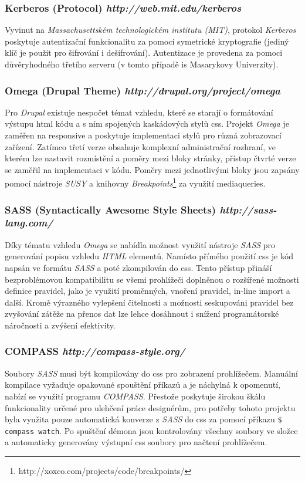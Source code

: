 \subsubsection*{\textbf{Kerberos} (Protocol) \hfill \emph{http://web.mit.edu/kerberos}}
Vyvinut na \emph{Massachusettském technologickém institutu (MIT)}, protokol \emph{Kerberos} poskytuje autentizační funkcionalitu za pomocí symetrické kryptografie (jediný klíč je použit pro šifrování i dešifrování). Autentizace je provedena za pomoci důvěryhodného třetího serveru (v tomto případě \gls{is} Masarykovy Univerzity).

\subsubsection*{\textbf{Omega} (Drupal Theme) \hfill \emph{http://drupal.org/project/omega}}
\label{subsec:omega}
Pro \emph{Drupal} existuje nespočet témat vzhledu, které se starají o formátování výstupu html kódu a s ním spojených kaskádových stylů \gls{css}. Projekt \emph{Omega} je zaměřen na \gls{responsive} a poskytuje implementaci stylů pro různá zobrazovací zařízení. Zatímco třetí verze obsahuje komplexní administrační rozhraní, ve kterém lze nastavit rozmístění a poměry mezi bloky stránky, přístup čtvrté verze se zaměřil na implementaci v kódu. Poměry mezi jednotlivými bloky jsou zapsány pomocí nástroje \emph{SUSY} a knihovny \emph{Breakpoints}\footnote{http://xoxco.com/projects/code/breakpoints/} za využití \gls{mediaqueries}.

\subsubsection*{\textbf{SASS} (Syntactically Awesome Style Sheets) \hfill \emph{http://sass-lang.com/}}
\label{subsec:sass}
Díky tématu vzhledu \emph{Omega} se nabídla možnost využití nástroje \emph{SASS} pro generování popisu vzhledu \emph{HTML} elementů. Namísto přímého použití \gls{css} je kód napsán ve formátu \emph{SASS} a poté zkompilován do \gls{css}. Tento přístup přináší bezproblémovou kompatibilitu se všemi prohlížeči doplněnou o rozšířené možnosti definice pravidel, jako je využití proměnných, vnoření pravidel, in-line import a další. Kromě výrazného vylepšení čitelnosti a možnosti seskupováni pravidel bez zvyšování zátěže na přenos dat lze lehce dosáhnout i snížení programátorské náročnosti a zvýšení efektivity.

\subsubsection*{\textbf{COMPASS} \hfill \emph{http://compass-style.org/}}
\label{subsec:compass}
Soubory \emph{SASS} musí být kompilovány do \gls{css} pro zobrazení prohlížečem. Manuální kompilace vyžaduje opakované spouštění příkazů a je náchylná k opomenutí, nabízí se využití programu \emph{COMPASS}. Přestože poskytuje širokou škálu funkcionality určené pro ulehčení práce designérům, pro potřeby tohoto projektu byla využita pouze automatická konverze z \emph{SASS} do \gls{css} za pomocí příkazu \texttt{\$ compass watch}. Po spuštění démona jsou kontrolovány všechny soubory ve složce a automaticky generovány výstupní \gls{css} soubory pro načtení prohlížečem.

